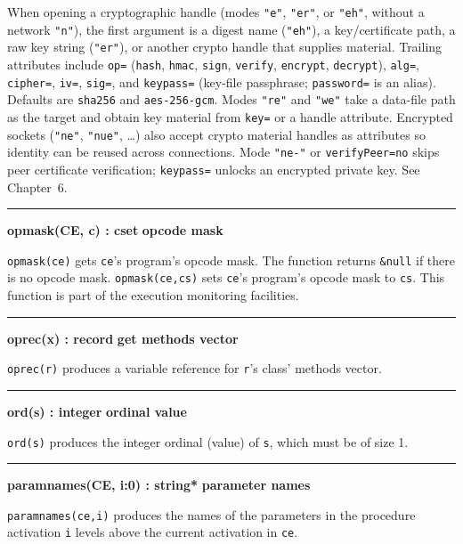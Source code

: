 When opening a cryptographic handle (modes \texttt{"e"}, \texttt{"er"},
or \texttt{"eh"}, without a network \texttt{"n"}), the first argument is
a digest name (\texttt{"eh"}), a key/certificate path, a raw key string
(\texttt{"er"}), or another crypto handle that supplies material.
Trailing attributes include \texttt{op=} (\texttt{hash}, \texttt{hmac},
\texttt{sign}, \texttt{verify}, \texttt{encrypt}, \texttt{decrypt}),
\texttt{alg=}, \texttt{cipher=}, \texttt{iv=}, \texttt{sig=}, and
\texttt{keypass=} (key-file passphrase; \texttt{password=} is an alias).
Defaults are \texttt{sha256} and \texttt{aes-256-gcm}.
Modes \texttt{"re"} and \texttt{"we"} take a data-file path as the
target and obtain key material from \texttt{key=} or a handle attribute.
Encrypted sockets (\texttt{"ne"}, \texttt{"nue"}, \ldots) also accept
crypto material handles as attributes so identity can be reused across
connections. Mode \texttt{"ne-"} or \texttt{verifyPeer=no} skips peer
certificate verification; \texttt{keypass=} unlocks an encrypted
private key. See Chapter~6.

\bigskip\hrule\vspace{0.1cm}
\noindent
{\bf opmask(CE, c) : cset } \hfill {\bf opcode mask}

\noindent
\texttt{opmask(ce)} gets \texttt{ce}'s
program's opcode mask. The function returns
\texttt{\&null} if there is no opcode mask. \texttt{opmask(ce,cs)} sets
\texttt{ce}'s program's opcode mask
to \texttt{cs}. This function is part of the execution monitoring
facilities.

\bigskip\hrule\vspace{0.1cm}
\noindent
{\bf oprec(x) : record } \hfill {\bf get methods vector}

\noindent
\texttt{oprec(r)} produces a variable reference for
\texttt{r}'s class' methods vector.

\bigskip\hrule\vspace{0.1cm}
\noindent
{\bf ord(s) : integer } \hfill {\bf ordinal value}

\noindent
{}\texttt{ord(s)} produces the integer ordinal
(value) of \texttt{s}, which must be of size 1.

\bigskip\hrule\vspace{0.1cm}
\noindent
{\bf paramnames(CE, i:0) : string* } \hfill {\bf parameter names}

\noindent
{}\texttt{paramnames(ce,i)} produces the names of
the parameters in the procedure activation \texttt{i} levels above the
current activation in \texttt{ce}.

